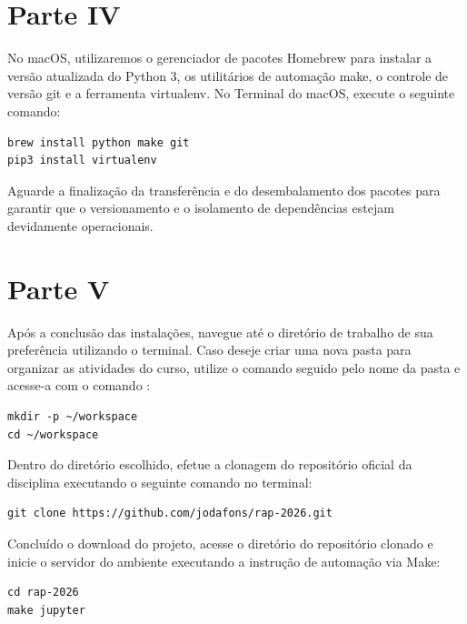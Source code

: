 \section*{Parte IV}

No macOS, utilizaremos o gerenciador de pacotes Homebrew para instalar a versão atualizada do Python 3, os utilitários de automação make, o controle de versão git e a ferramenta virtualenv. No Terminal do macOS, execute o seguinte comando:

\vspace{0.3cm}
\begin{lstlisting}
brew install python make git
pip3 install virtualenv
\end{lstlisting}

Aguarde a finalização da transferência e do desembalamento dos pacotes para garantir que o versionamento e o isolamento de dependências estejam devidamente operacionais.

\section*{Parte V}

Após a conclusão das instalações, navegue até o diretório de trabalho de sua preferência utilizando o terminal. Caso deseje criar uma nova pasta para organizar as atividades do curso, utilize o comando  seguido pelo nome da pasta e acesse-a com o comando :

\vspace{0.3cm}
\begin{lstlisting}
mkdir -p ~/workspace
cd ~/workspace
\end{lstlisting}


Dentro do diretório escolhido, efetue a clonagem do repositório oficial da disciplina executando o seguinte comando no terminal:

\vspace{0.3cm}
\begin{lstlisting}
git clone https://github.com/jodafons/rap-2026.git
\end{lstlisting}


Concluído o download do projeto, acesse o diretório do repositório clonado e inicie o servidor do ambiente executando a instrução de automação via Make:

\vspace{0.3cm}
\begin{lstlisting}
cd rap-2026
make jupyter
\end{lstlisting}

